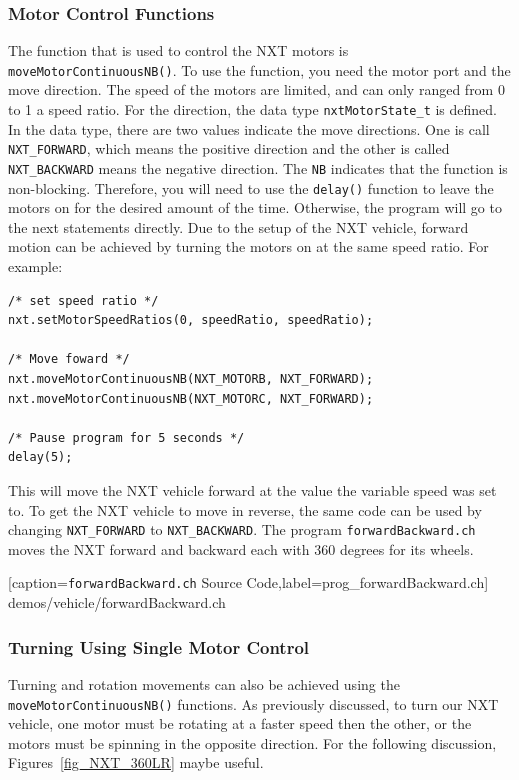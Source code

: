 \documentclass[11pt]{article}
\begin{document}
\subsubsection{Motor Control Functions}
The function that is used to control the NXT motors is {\tt moveMotorContinuousNB()}. 
To use the function, you need the motor port and the move direction. The speed 
of the motors are limited, and can only ranged from 0 to 1 a speed ratio. For 
the direction, the data type {\tt nxtMotorState\_t} is defined. In the data type, 
there are two values indicate the move directions. One is call {\tt NXT\_FORWARD},
which means the positive direction and the other is called {\tt NXT\_BACKWARD} 
means the negative direction. The {\tt NB} indicates that the function is 
non-blocking. Therefore, you will need to use the {\tt delay()} function to leave 
the motors on for the desired amount of the time. Otherwise, the program will go 
to the next statements directly. Due to the setup of the NXT vehicle, forward 
motion can be achieved by turning the motors on at the same speed ratio. For 
example:
\begin{lstlisting}
/* set speed ratio */
nxt.setMotorSpeedRatios(0, speedRatio, speedRatio);

/* Move foward */
nxt.moveMotorContinuousNB(NXT_MOTORB, NXT_FORWARD);
nxt.moveMotorContinuousNB(NXT_MOTORC, NXT_FORWARD);

/* Pause program for 5 seconds */
delay(5);
\end{lstlisting}
This will move the NXT vehicle forward at the value the variable speed was set to. 
To get the NXT vehicle to move in reverse, the same code can be used by changing 
{\tt NXT\_FORWARD} to {\tt NXT\_BACKWARD}. The program {\tt forwardBackward.ch} 
moves the NXT forward and backward each with 360 degrees for its wheels.

    [caption={{\tt forwardBackward.ch} Source Code},label=prog_forwardBackward.ch]
    {demos/vehicle/forwardBackward.ch}
\subsubsection{Turning Using Single Motor Control}
Turning and rotation movements can also be achieved using the 
{\tt moveMotorContinuousNB()} functions. As previously discussed, to turn our 
NXT vehicle, one motor must be rotating at a faster speed then the other, or 
the motors must be spinning in the opposite direction. For the following 
discussion, Figures~\ref{fig_NXT_360LR} maybe useful.\\
\end{document}
